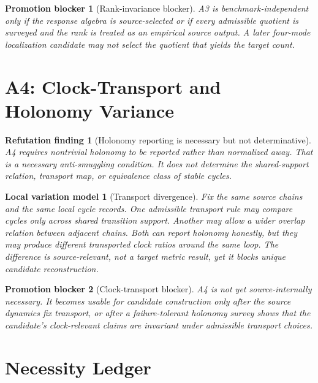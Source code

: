 \documentclass[11pt]{article}
\newtheorem{finding}{Refutation finding}
\newtheorem{countermodel}{Local variation model}
\newtheorem{blocker}{Promotion blocker}
\begin{document}
\begin{blocker}[Rank-invariance blocker]
A3 is benchmark-independent only if the response algebra is source-selected
or if every admissible quotient is surveyed and the rank is treated as an
empirical source output. A later four-mode localization candidate may not
select the quotient that yields the target count.
\end{blocker}

\section{A4: Clock-Transport and Holonomy Variance}

\begin{finding}[Holonomy reporting is necessary but not determinative]
A4 requires nontrivial holonomy to be reported rather than normalized away.
That is a necessary anti-smuggling condition. It does not determine the
shared-support relation, transport map, or equivalence class of stable cycles.
\end{finding}

\begin{countermodel}[Transport divergence]
Fix the same source chains and the same local cycle records. One admissible
transport rule may compare cycles only across shared transition support.
Another may allow a wider overlap relation between adjacent chains. Both can
report holonomy honestly, but they may produce different transported clock
ratios around the same loop. The difference is source-relevant, not a target
metric result, yet it blocks unique candidate reconstruction.
\end{countermodel}

\begin{blocker}[Clock-transport blocker]
A4 is not yet source-internally necessary. It becomes usable for candidate
construction only after the source dynamics fix transport, or after a
failure-tolerant holonomy survey shows that the candidate's clock-relevant
claims are invariant under admissible transport choices.
\end{blocker}

\section{Necessity Ledger}
\end{document}
